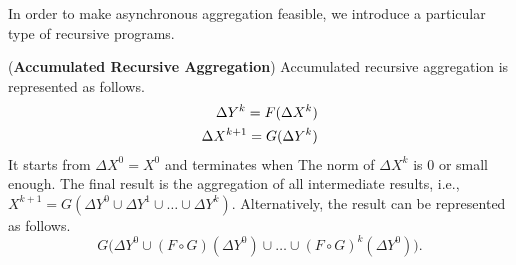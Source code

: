 In order to make asynchronous aggregation feasible, we introduce a particular type of recursive programs.

\begin{definition}
	\label{def:accumasync}
	(\textbf{Accumulated Recursive Aggregation}) Accumulated recursive aggregation is represented as follows.
	\begin{equation}\label{eq:accumasync}
	\begin{aligned}
	\Delta Y^{k}= F(\Delta X^k)\notag\\
	\Delta X^{k+1}= G(\Delta Y^{k})\notag
	\end{aligned}
	\end{equation}
	It starts from $\Delta X^0=X^0$ and terminates when The norm of $\Delta X^k$ is 0 or small enough. The final result is the aggregation of all intermediate results, i.e., $X^{k+1}=G(\Delta Y^{0} \cup \Delta Y^{1} \cup \ldots \cup \Delta Y^{k})$. Alternatively, the result can be represented as follows.
	\begin{equation}
	\label{eq:accumasyncres}
	G\Big(\Delta Y^0\cup (F\circ G)(\Delta Y^0)\cup\ldots\cup (F\circ G)^k(\Delta Y^0)\Big).
	\end{equation}
\end{definition}

